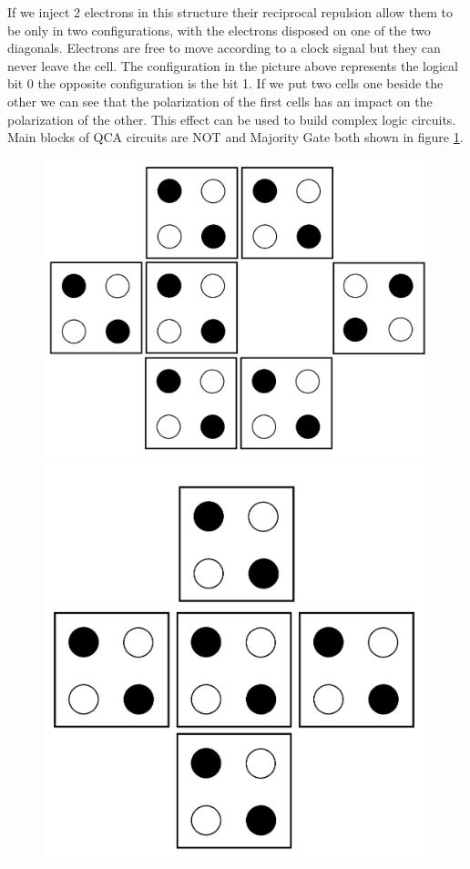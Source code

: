 If we inject 2 electrons in this structure their reciprocal repulsion allow them to be only in two configurations, with the electrons disposed on one of the two diagonals. Electrons are free to move according to a clock signal but they can never leave the cell.
The configuration in the picture above represents the logical bit 0 the opposite configuration is the bit 1. 
If we put two cells one beside the other we can see that the polarization of the first cells has an impact on the polarization of the other. This effect can be used to build complex logic circuits. Main blocks of QCA circuits are NOT and Majority Gate both shown in figure \ref{img:gates}.
\begin{figure}
\centering
\includegraphics[scale=0.1]{img/not_normal.png}
\includegraphics[scale=0.1]{img/majority.png}
\label{img:gates}
\end{figure}

